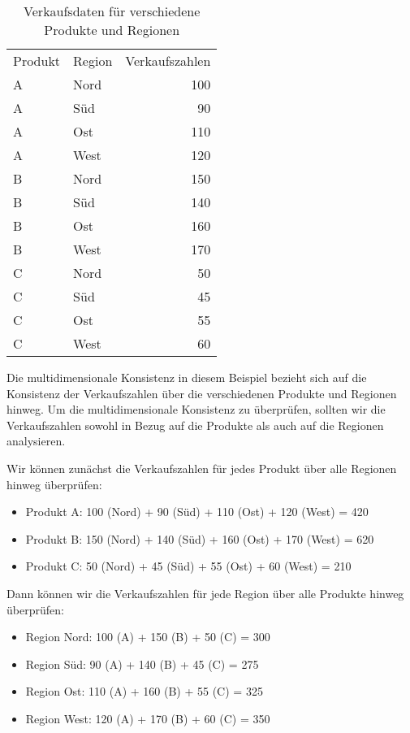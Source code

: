 \begin{table}[ht!]
\centering
\begin{tabular}{@{}llr@{}}
Produkt & Region & Verkaufszahlen \\ 
A       & Nord   & 100            \\
A       & Süd    & 90             \\
A       & Ost    & 110            \\
A       & West   & 120            \\
B       & Nord   & 150            \\
B       & Süd    & 140            \\
B       & Ost    & 160            \\
B       & West   & 170            \\
C       & Nord   & 50             \\
C       & Süd    & 45             \\
C       & Ost    & 55             \\
C       & West   & 60             \\ 
\end{tabular}
\caption{Verkaufsdaten für verschiedene Produkte und Regionen}
\end{table}
Die multidimensionale Konsistenz in diesem Beispiel bezieht sich auf die Konsistenz der Verkaufszahlen über die verschiedenen Produkte und Regionen hinweg. Um die multidimensionale Konsistenz zu überprüfen, sollten wir die Verkaufszahlen sowohl in Bezug auf die Produkte als auch auf die Regionen analysieren.

Wir können zunächst die Verkaufszahlen für jedes Produkt über alle Regionen hinweg überprüfen:
\begin{itemize}
    \item Produkt A: 100 (Nord) + 90 (Süd) + 110 (Ost) + 120 (West) = 420
    \item Produkt B: 150 (Nord) + 140 (Süd) + 160 (Ost) + 170 (West) = 620
    \item Produkt C: 50 (Nord) + 45 (Süd) + 55 (Ost) + 60 (West) = 210
\end{itemize}
Dann können wir die Verkaufszahlen für jede Region über alle Produkte hinweg überprüfen:
\begin{itemize}
    \item Region Nord: 100 (A) + 150 (B) + 50 (C) = 300
    \item Region Süd: 90 (A) + 140 (B) + 45 (C) = 275
    \item Region Ost: 110 (A) + 160 (B) + 55 (C) = 325
    \item Region West: 120 (A) + 170 (B) + 60 (C) = 350
\end{itemize}

